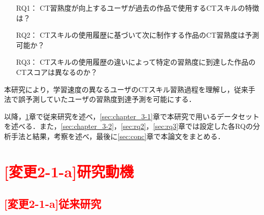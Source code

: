 \documentclass[submit]{ipsj}
\begin{document}
\begin{itemize}
\item[RQ1：]CT習熟度が向上するユーザが\textcolor{red}{}過去の作品で使用するCTスキルの特徴は？
\item[RQ2：]CTスキルの使用履歴に基づいて次に制作する作品のCT習熟度は予測可能か？
\item[RQ3：]CTスキルの使用履歴の違いによって特定の習熟度に到達した作品のCTスコアは異なるのか？
\end{itemize}

本研究により，学習速度の異なるユーザのCTスキル習熟過程を理解し，従来手法で誤予測していたユーザの習熟度到達予測を可能にする．




以降，\ref{sec:relate}章で従来研究を述べ，\ref{sec:chapter_3-1}章で本研究で用いるデータセットを述べる．また，\ref{sec:chapter_3-2}，\ref{sec:rq2}，\ref{sec:rq3}章では設定した各RQの分析手法と結果，考察を述べ，最後に\ref{sec:conc}章で本論文をまとめる．


\section{\textcolor{red}{[変更2-1-a]研究動機}}\label{sec:relate}

\subsection{\textcolor{red}{[変更2-1-a]従来研究}}\label{sec:relate-1}

\end{document}
